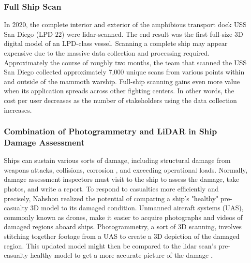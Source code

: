 \subsubsection{Full Ship Scan}
In 2020, the complete interior and exterior of the amphibious transport dock USS San Diego (LPD 22) were lidar-scanned. The end result was the first full-size 3D digital model of an LPD-class vessel. Scanning a complete ship may appear expensive due to the massive data collection and processing required. Approximately the course of roughly two months, the team that scanned the USS San Diego collected approximately 7,000 unique scans from various points within and outside of the mammoth warship. Full-ship scanning gains even more value when its application spreads across other fighting centers. In other words, the cost per user decreases as the number of stakeholders using the data collection increases\cite{defenseadvancement}. 
\subsubsection{Combination of Photogrammetry and LiDAR in Ship Damage Assessment}
Ships can sustain various sorts of damage, including structural damage from weapons attacks, collisions, corrosion \cite{aijazi2016detecting}, and exceeding operational loads. Normally, damage assessment inspectors must visit to the ship to assess the damage, take photos, and write a report. To respond to casualties more efficiently and precisely, Nahshon realized the potential of comparing a ship's "healthy" pre-casualty 3D model to its damaged condition. Unmanned aircraft systems (UAS), commonly known as drones, make it easier to acquire photographs and videos of damaged regions aboard ships. Photogrammetry, a sort of 3D scanning, involves stitching together footage from a UAS to create a 3D depiction of the damaged region. This updated model might then be compared to the lidar scan's pre-casualty healthy model to get a more accurate picture of the damage \cite{defenseadvancement}. 

